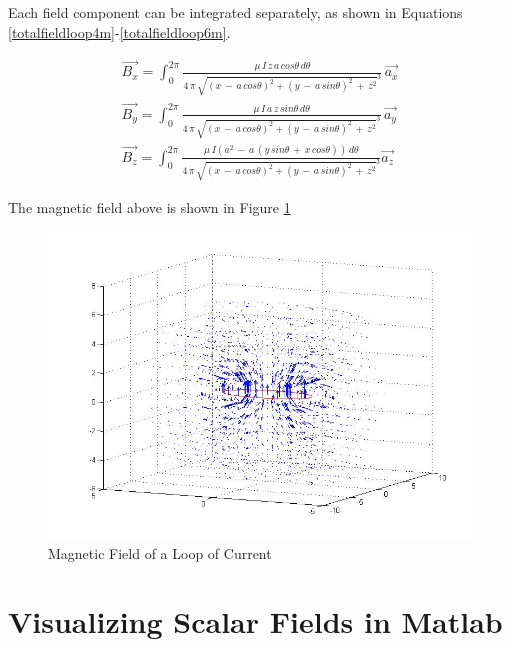 \documentclass{ximera}
\begin{document}
Each field component can be integrated separately, as shown in Equations \ref{totalfieldloop4m}-\ref{totalfieldloop6m}.



\begin{eqnarray}
\vec{B_x}= \int_0^{2\pi}\frac{\mu\,  I\,  z\,  a\,  cos\theta \, d\theta}{4 \, \pi\,  \sqrt{(x\,  - \, a \,cos{\theta})^2 +(y \,- \,a \,sin{\theta})^2 \,+\,z ^2}^3 }  \, \vec{a_x} \label{totalfieldloop4m} \\
\vec{B_y}=  \int_0^{2\pi} \frac{\mu \, I \, a \, z\, sin\theta\, d\theta}{4\, \pi \, \sqrt{(x \,-\,  a \,cos{\theta})^2 +(y \, - \, a \,sin{\theta})^2 \,+\, z ^2}^3 }  \, \vec{a_y} \label{totalfieldloop5m} \\
\vec{B_z}=  \int_0^{2\pi} \frac{\mu  \,I(a^2 \,-\,a\, (y\, sin\theta \,+\, x\, cos\theta))\,d\theta}{4 \,\pi\, \sqrt{(x\, -\, a \,cos{\theta})^2 +(y\, -\, a \,sin{\theta})^2 \,+\,z ^2}^3 }  \vec{a_z} \label{totalfieldloop6m}
\end{eqnarray}

The magnetic field above is shown in Figure \ref{mflmat}

\begin{figure}[htbp]
\begin{center}
\includegraphics[scale=0.3]{../jpg/bfieldloop.jpg}
\end{center}
\caption{Magnetic Field of a Loop of Current }
\label{mflmat}
\end{figure}



\section{Visualizing Scalar Fields in Matlab}
\end{document}
